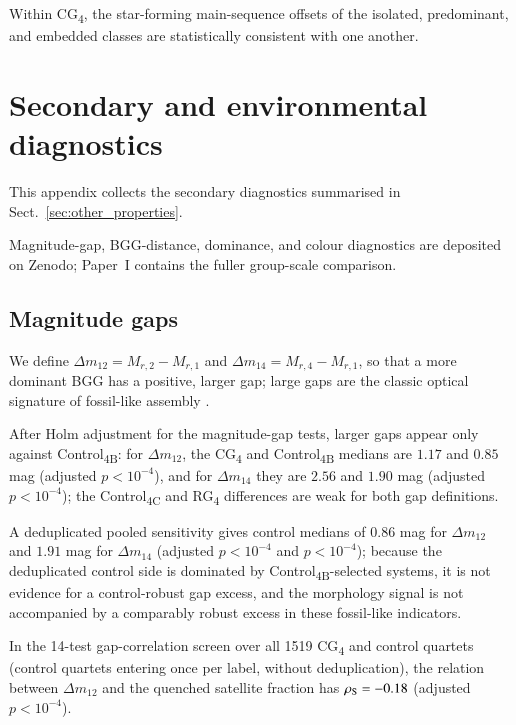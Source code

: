 \documentclass{aa}
\newcommand{\CB}{Control\textsubscript{4B}}
\newcommand{\CC}{Control\textsubscript{4C}}
\newcommand{\CG}{CG\textsubscript{4}}
\newcommand{\RG}{RG\textsubscript{4}}
\begin{document}
\begin{appendix}
Within \CG, the star-forming main-sequence offsets of the isolated, predominant, and embedded classes are statistically consistent with one another.


\FloatBarrier

\section{Secondary and environmental diagnostics}\label{app:env_diagnostics}

This appendix collects the secondary diagnostics summarised in Sect.~\ref{sec:other_properties}.

Magnitude-gap, BGG-distance, dominance, and colour diagnostics are deposited on Zenodo; Paper~I contains the fuller group-scale comparison.

\iffalse


\subsection{Magnitude gaps}\label{app:magnitude_gaps}
We define \(\Delta m_{12}=M_{r,2}-M_{r,1}\) and \(\Delta m_{14}=M_{r,4}-M_{r,1}\), so that a more dominant BGG has a positive, larger gap; large gaps are the classic optical signature of fossil-like assembly \citep{Ponman+94,Jones+03,Dariush+10}.


After Holm adjustment for the magnitude-gap tests, larger gaps appear only against \CB{}: for \(\Delta m_{12}\), the \CG{} and \CB{} medians are \(1.17\) and \(0.85\) mag (adjusted \(p<10^{-4}\)), and for \(\Delta m_{14}\) they are \(2.56\) and \(1.90\) mag (adjusted \(p<10^{-4}\)); the \CC{} and \RG{} differences are weak for both gap definitions.



A deduplicated pooled sensitivity gives control medians of \(0.86\) mag for \(\Delta m_{12}\) and \(1.91\) mag for \(\Delta m_{14}\) (adjusted \(p<10^{-4}\) and \(p<10^{-4}\)); because the deduplicated control side is dominated by \CB{}-selected systems, it is not evidence for a control-robust gap excess, and the morphology signal is not accompanied by a comparably robust excess in these fossil-like indicators.



In the 14-test gap-correlation screen over all 1519 \CG{} and control quartets (control quartets entering once per label, without deduplication), the relation between \(\Delta m_{12}\) and the quenched satellite fraction has \(\rho_{\rm S}=-0.18\) (adjusted \(p<10^{-4}\)).



\end{appendix}
\end{document}
